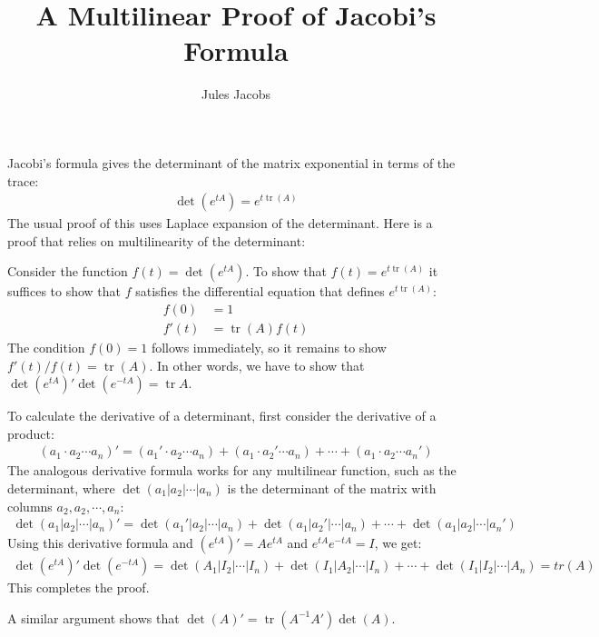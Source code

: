 

\newcommand{\tac}[1]{\lstinline[mathescape]~#1~}
\newcommand{\ciff}{\ \leftrightarrow\ }
\newcommand{\hyp}{\tac{H}}
\newcommand{\hypB}{\tac{G}}
\newcommand{\var}{\tac{x}}
\newcommand{\varB}{\tac{y}}

\newtheorem*{nlemma}{Lemma}

\DeclareMathOperator*{\tr}{tr}



\title{A Multilinear Proof of Jacobi's Formula}
\author{Jules Jacobs}


\maketitle

Jacobi's formula gives the determinant of the matrix exponential in terms of the trace:
\begin{align*}
  \det(e^{tA}) = e^{t\tr(A)}
\end{align*}
The usual proof of this uses Laplace expansion of the determinant.
Here is a proof that relies on multilinearity of the determinant:

Consider the function $f(t) = \det(e^{tA})$. To show that $f(t) = e^{t\tr(A)}$ it suffices to show that $f$ satisfies the differential equation that defines $e^{t\tr(A)}$:
\begin{align*}
  f(0) &= 1\\
  f'(t) &= \tr(A)f(t)
\end{align*}
The condition $f(0) = 1$ follows immediately, so it remains to show $f'(t)/f(t) = \tr(A)$.
In other words, we have to show that $\det(e^{tA})'\det(e^{-tA}) = \tr{A}$.

To calculate the derivative of a determinant, first consider the derivative of a product:
\begin{align*}
  (a_1 \cdot a_2 \cdots a_n)' = (a_1' \cdot a_2 \cdots a_n)
                              + (a_1 \cdot a_2' \cdots a_n)
                              + \cdots
                              + (a_1 \cdot a_2 \cdots a_n')
\end{align*}
The analogous derivative formula works for any multilinear function, such as the determinant,
where $\det(a_1 | a_2 | \cdots |a_n)$ is the determinant of the matrix with columns $a_2, a_2, \cdots, a_n$:
\begin{align*}
  \det(a_1 | a_2 | \cdots |a_n)' = \det(a_1'| a_2 | \cdots | a_n)
                                 + \det(a_1 | a_2'| \cdots | a_n)
                                 + \cdots
                                 + \det(a_1 | a_2 | \cdots | a_n')
\end{align*}
Using this derivative formula and $(e^{tA})' = Ae^{tA}$ and $e^{tA}e^{-tA} = I$, we get:
\begin{align*}
  \det(e^{tA})'\det(e^{-tA})
                = \det(A_1 | I_2 | \cdots | I_n)
                + \det(I_1 | A_2 | \cdots | I_n)
                + \cdots
                + \det(I_1 | I_2 | \cdots | A_n)
                = tr(A)
\end{align*}
This completes the proof.

A similar argument shows that $\det(A)' = \tr(A^{-1}A')\det(A)$.



